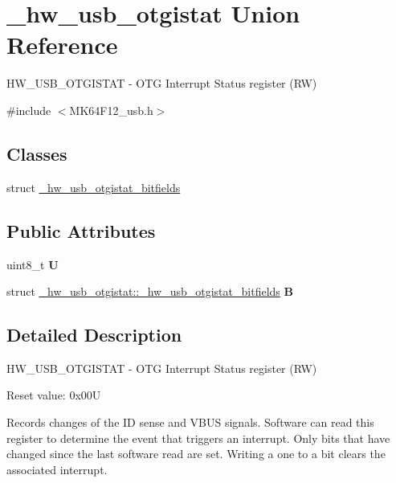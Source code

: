 \hypertarget{union__hw__usb__otgistat}{}\section{\+\_\+hw\+\_\+usb\+\_\+otgistat Union Reference}
\label{union__hw__usb__otgistat}


H\+W\+\_\+\+U\+S\+B\+\_\+\+O\+T\+G\+I\+S\+T\+AT -\/ O\+TG Interrupt Status register (RW)  




{\ttfamily \#include $<$M\+K64\+F12\+\_\+usb.\+h$>$}

\subsection*{Classes}
\begin{DoxyCompactItemize}
\item 
struct \hyperlink{struct__hw__usb__otgistat_1_1__hw__usb__otgistat__bitfields}{\+\_\+hw\+\_\+usb\+\_\+otgistat\+\_\+bitfields}
\end{DoxyCompactItemize}
\subsection*{Public Attributes}
\begin{DoxyCompactItemize}
\item 
uint8\+\_\+t {\bfseries U}\hypertarget{union__hw__usb__otgistat_a89676fcb4a3ea7ec2136938048d7bd26}{}\label{union__hw__usb__otgistat_a89676fcb4a3ea7ec2136938048d7bd26}

\item 
struct \hyperlink{struct__hw__usb__otgistat_1_1__hw__usb__otgistat__bitfields}{\+\_\+hw\+\_\+usb\+\_\+otgistat\+::\+\_\+hw\+\_\+usb\+\_\+otgistat\+\_\+bitfields} {\bfseries B}\hypertarget{union__hw__usb__otgistat_a52d261403ce5a63aefe4693203af1d51}{}\label{union__hw__usb__otgistat_a52d261403ce5a63aefe4693203af1d51}

\end{DoxyCompactItemize}


\subsection{Detailed Description}
H\+W\+\_\+\+U\+S\+B\+\_\+\+O\+T\+G\+I\+S\+T\+AT -\/ O\+TG Interrupt Status register (RW) 

Reset value\+: 0x00U

Records changes of the ID sense and V\+B\+US signals. Software can read this register to determine the event that triggers an interrupt. Only bits that have changed since the last software read are set. Writing a one to a bit clears the associated interrupt. 

